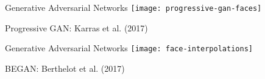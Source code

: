 %
%

\begin{slide}{Generative Adversarial Networks}
  \texttt{[image: progressive-gan-faces]}

  \vspace{0.1cm}
  \begin{flushleft}
    \scriptsize
    Progressive GAN: Karras et al. (2017)
  \end{flushleft}
\end{slide}

%

\begin{slide}{Generative Adversarial Networks}
  \texttt{[image: face-interpolations]}

  \vspace{0.1cm}
  \begin{flushleft}
    \scriptsize
    BEGAN: Berthelot et al. (2017)
  \end{flushleft}
\end{slide}

%
%
